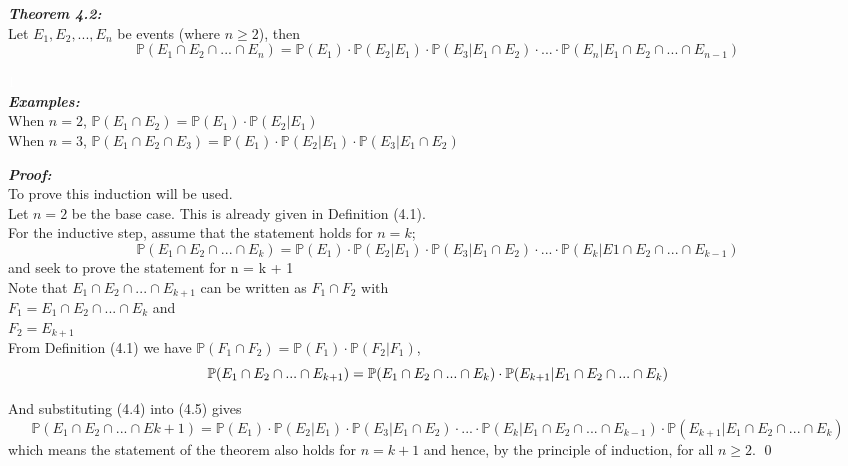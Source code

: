 \documentclass{report}
\newenvironment{cframed2}[1][PineGreen]
  {\begin{tcolorbox}[colframe=#1,colback=white]}
  {\end{tcolorbox}}
\newenvironment{cframedp}[1][Black]
  {\begin{tcolorbox}[colframe=#1,colback=white]}
  {\end{tcolorbox}}
\begin{document}
\begin{cframed2}
\textcolor{PineGreen}{\textit{\textbf{Theorem 4.2:}}}\\
\textcolor{PineGreen}{Let $E_1,E_2,...,E_n$ be events (where $n \geq 2$), then}
\textcolor{PineGreen}{\begin{equation}
    \mathbb{P}(E_1 \cap E_2 \cap ... \cap E_n) = \mathbb{P}(E_1) \cdot \mathbb{P}(E_2|E_1) \cdot \mathbb{P}(E_3|E_1 \cap E_2) \cdot ... \cdot \mathbb{P}(E_n|E_1 \cap E_2 \cap ... \cap E_{n-1})
\end{equation}}
\end{cframed2}

\textcolor{White}{1}\\
\textit{\textbf{Examples:}}\\
When $n=2$, $\mathbb{P}(E_1 \cap E_2) = \mathbb{P}(E_1) \cdot \mathbb{P}(E_2|E_1)$\\
When $n=3$, $\mathbb{P}(E_1 \cap E_2 \cap E_3) = \mathbb{P}(E_1) \cdot \mathbb{P}(E_2|E_1) \cdot \mathbb{P}(E_3|E_1 \cap E_2)$\\

\begin{cframedp}
\textit{\textbf{Proof:}}\\
To prove this induction will be used.\\
Let $n = 2$ be the base case. This is already given in Definition (4.1).\\

For the inductive step, assume that the statement holds for $n = k$;
\begin{equation}
    \mathbb{P}(E_1 \cap E_2 \cap ... \cap E_k) = \mathbb{P}(E_1) \cdot \mathbb{P}(E_2|E_1) \cdot \mathbb{P}(E_3|E_1 \cap E_2) \cdot ... \cdot \mathbb{P}(E_k|E1 \cap E_2 \cap ... \cap E_{k-1})
\end{equation}
and seek to prove the statement for n = k + 1\\

Note that $E_1 \cap E_2 \cap ...\cap E_{k+1}$ can be written as $F_1 \cap F_2$ with\\
$F_1 = E_1 \cap E_2 \cap ... \cap E_k$ and\\
$F_2 = E_{k+1}$\\

From Definition (4.1) we have $\mathbb{P}(F_1 \cap F_2) = \mathbb{P}(F_1) \cdot \mathbb{P}(F_2|F_1)$,
\begin{equation}
    \mathbb{P}(E_1 \cap E_2 \cap ... \cap E_{k+1}) = \mathbb{P}(E_1 \cap E_2 \cap ... \cap E_k) \cdot \mathbb{P}(E_{k+1}|E_1 \cap E_2 \cap ... \cap E_k)\\
\end{equation}

And substituting (4.4) into (4.5) gives
\begin{equation}
    \mathbb{P}(E_1 \cap E_2 \cap ... \cap E{k+1}) = \mathbb{P}(E_1) \cdot \mathbb{P}(E_2|E_1) \cdot \mathbb{P}(E_3|E_1 \cap E_2) \cdot ... \cdot \mathbb{P}(E_k|E_1 \cap E_2 \cap ... \cap E_{k-1}) \cdot \mathbb{P}(E_{k+1}|E_1 \cap E_2 \cap ... \cap E_k)
\end{equation}
which means the statement of the theorem also holds for $n = k + 1$ and hence, by the principle of induction, for all $n \geq 2$.
\qed
\end{cframedp}
\end{document}
